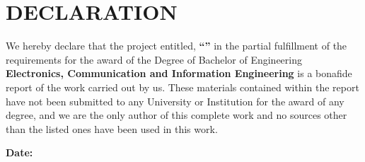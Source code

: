 \chapter*{DECLARATION}
{} %

\noindent We hereby declare that the project entitled, \textbf{``\cTitle''} in the partial fulfillment  of the requirements for the award of the Degree of Bachelor of Engineering \textbf{Electronics, Communication and Information Engineering} is a bonafide report of the work carried out by us. These materials contained within the report have not been submitted to any University or Institution for the award of any degree, and we are the only author of this complete work and no sources other than the listed ones have been used in this work.
\vspace{0.5cm}

\noindent \authorTable

\noindent \textbf{Date:} \cDate


